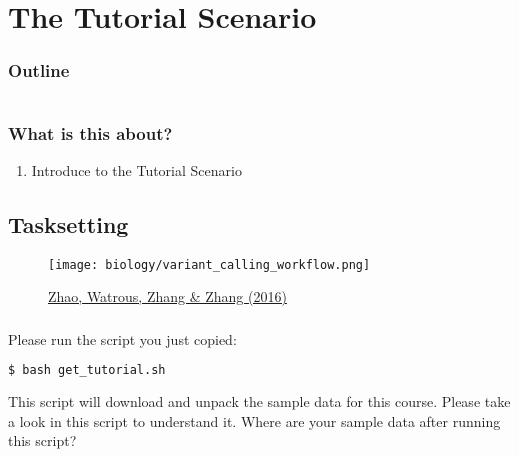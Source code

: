 \section{The Tutorial Scenario}

\begin{frame}
    \frametitle{Outline}
    \begin{columns}[t]
        \begin{column}{.5\textwidth}
            \tableofcontents[sections={1-7},currentsection]
        \end{column}
        \begin{column}{.5\textwidth}
            \tableofcontents[sections={8-15},currentsection]
        \end{column}
    \end{columns}
\end{frame}

\begin{frame}
	\frametitle{What is this about?}
	\begin{docs}[Objective]
		\begin{enumerate}
			\item Introduce to the Tutorial Scenario 
		\end{enumerate}
	\end{docs}
\end{frame}

\subsection{Tasksetting}

\begin{frame}
  \begin{figure}
    \centering
    \texttt{[image: biology/variant\_calling\_workflow.png]}

    \smallskip

    \caption{\href{https://www.intechopen.com/chapters/53334}{Zhao, Watrous, Zhang \& Zhang (2016)}}
  \end{figure}
\end{frame}


\begin{frame}[fragile]
	\frametitle{}
	Please run the  script you just copied:
	\begin{lstlisting}[language=Bash, style=Shell,basicstyle=\footnotesize]
$ bash get_tutorial.sh
	\end{lstlisting}
	\begin{task}
		This script will download and unpack the sample data for this course. Please take a look in this script to understand it. Where are your sample data after running this script?
	\end{task}
\end{frame}


